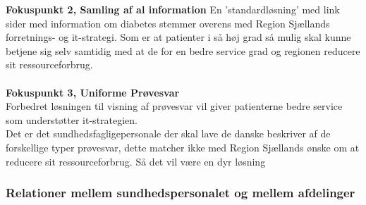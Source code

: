 \textbf{Fokuspunkt 2, Samling af al information}
En 'standardløsning' med link sider med information om diabetes stemmer overens med Region Sjællands forretnings- og it-strategi. 
Som er at patienter i så høj grad så mulig skal kunne betjene sig selv samtidig med at de for en bedre service grad og regionen reducere sit ressourceforbrug.
\\\\
%
\textbf{Fokuspunkt 3, Uniforme Prøvesvar}\\
Forbedret løsningen til visning af prøvesvar vil giver patienterne bedre service som understøtter it-strategien.\\
Det er det sundhedsfagligepersonale der skal lave de danske beskriver af de forskellige typer prøvesvar, dette matcher ikke med Region Sjællands ønske om at reducere sit ressourceforbrug. Så det vil være en dyr løsning\\
%
\subsubsection{Relationer mellem sundhedspersonalet og mellem afdelinger}